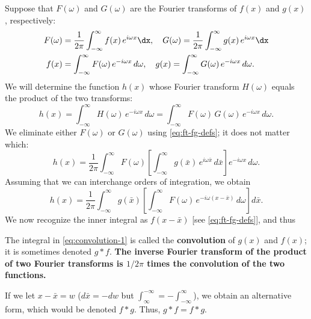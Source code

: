 Suppose that $F(\omega)$ and $G(\omega)$ are the Fourier transforms of $f(x)$ and $g(x)$, respectively:
\begin{equation}
\label{eq:ft-fg-defs}
\begin{aligned}
F(\omega) &= \frac{1}{2\pi}\int_{-\infty}^{\infty}f(x)\,e^{i\omega x}\dx, \quad G(\omega) = \frac{1}{2\pi}\int_{-\infty}^{\infty}g(x)\,e^{i\omega x}\dx \\
f(x) &= \int_{-\infty}^{\infty}F(\omega)\,e^{-i\omega x}\,d\omega, \quad g(x) = \int_{-\infty}^{\infty}G(\omega)\,e^{-i\omega x}\,d\omega.
\end{aligned}
\end{equation}
We will determine the function $h(x)$ whose Fourier transform $H(\omega)$ equals the product of the two transforms:
\begin{equation}
\label{eq:h-inverse}
h(x) = \int_{-\infty}^{\infty}H(\omega)\,e^{-i\omega x}\,d\omega = \int_{-\infty}^{\infty}F(\omega)\,G(\omega)\,e^{-i\omega x}\,d\omega.
\end{equation}
We eliminate either $F(\omega)$ or $G(\omega)$ using \eqref{eq:ft-fg-defs}; it does not matter which:
\[
h(x) = \frac{1}{2\pi}\int_{-\infty}^{\infty}F(\omega)\left[\int_{-\infty}^{\infty}g(\bar{x})\,e^{i\omega\bar{x}}\,d\bar{x}\right]e^{-i\omega x}\,d\omega.
\]
Assuming that we can interchange orders of integration, we obtain
\[
h(x) = \frac{1}{2\pi}\int_{-\infty}^{\infty}g(\bar{x})\left[\int_{-\infty}^{\infty}F(\omega)\,e^{-i\omega(x-\bar{x})}\,d\omega\right]d\bar{x}.
\]
We now recognize the inner integral as $f(x-\bar{x})$ [see \eqref{eq:ft-fg-defs}], and thus

The integral in \eqref{eq:convolution-1} is called the \textbf{convolution} of $g(x)$ and $f(x)$; it is sometimes denoted $g * f$.  \textbf{The inverse Fourier transform of the product of two Fourier transforms is $1/2\pi$ times the convolution of the two functions.}

If we let $x - \bar{x} = w$ ($d\bar{x} = -dw$ but $\int_{\infty}^{-\infty} = -\int_{-\infty}^{\infty}$), we obtain an alternative form,
which would be denoted $f * g$.  Thus, $g * f = f * g$.

